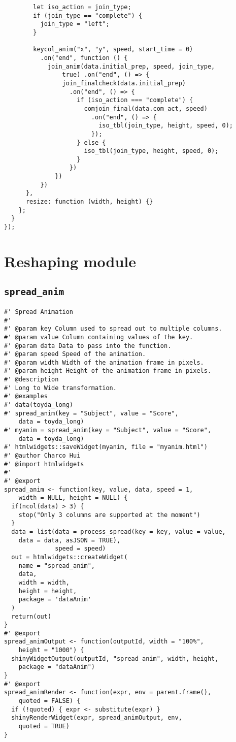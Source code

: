 \begin{lstlisting}
        let iso_action = join_type;
        if (join_type == "complete") {
          join_type = "left";
        }

        keycol_anim("x", "y", speed, start_time = 0)
          .on("end", function () {
            join_anim(data.initial_prep, speed, join_type, 
                true) .on("end", () => {
                join_finalcheck(data.initial_prep)
                  .on("end", () => {
                    if (iso_action === "complete") {
                      comjoin_final(data.com_act, speed)
                        .on("end", () => {
                          iso_tbl(join_type, height, speed, 0);
                        });
                    } else {
                      iso_tbl(join_type, height, speed, 0);
                    }
                  })
              })
          })
      },
      resize: function (width, height) {}
    };
  }
});
\end{lstlisting}

\section{Reshaping module}

\subsection{\texttt{spread\_anim}}

\begin{lstlisting}
#' Spread Animation
#'
#' @param key Column used to spread out to multiple columns.
#' @param value Column containing values of the key.
#' @param data Data to pass into the function.
#' @param speed Speed of the animation.
#' @param width Width of the animation frame in pixels.
#' @param height Height of the animation frame in pixels.
#' @description
#' Long to Wide transformation.
#' @examples
#' data(toyda_long)
#' spread_anim(key = "Subject", value = "Score", 
    data = toyda_long)
#' myanim = spread_anim(key = "Subject", value = "Score", 
    data = toyda_long)
#' htmlwidgets::saveWidget(myanim, file = "myanim.html")
#' @author Charco Hui
#' @import htmlwidgets
#'
#' @export
spread_anim <- function(key, value, data, speed = 1, 
    width = NULL, height = NULL) {
  if(ncol(data) > 3) {
    stop("Only 3 columns are supported at the moment")
  }
  data = list(data = process_spread(key = key, value = value, 
    data = data, asJSON = TRUE),
              speed = speed)
  out = htmlwidgets::createWidget(
    name = "spread_anim",
    data,
    width = width,
    height = height,
    package = 'dataAnim'
  )
  return(out)
}
#' @export
spread_animOutput <- function(outputId, width = "100%", 
    height = "1000") {
  shinyWidgetOutput(outputId, "spread_anim", width, height, 
    package = "dataAnim")
}
#' @export
spread_animRender <- function(expr, env = parent.frame(), 
    quoted = FALSE) {
  if (!quoted) { expr <- substitute(expr) } 
  shinyRenderWidget(expr, spread_animOutput, env, 
    quoted = TRUE)
}

\end{lstlisting}

